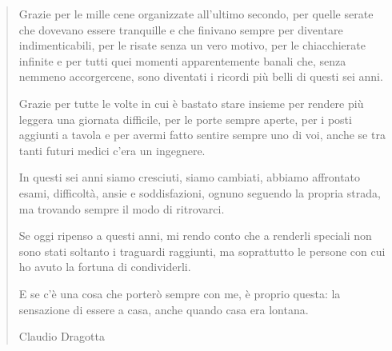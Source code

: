\begin{quote}
Grazie per le mille cene organizzate all'ultimo secondo, per quelle serate che dovevano essere tranquille e che finivano sempre per diventare indimenticabili, per le risate senza un vero motivo, per le chiacchierate infinite e per tutti quei momenti apparentemente banali che, senza nemmeno accorgercene, sono diventati i ricordi più belli di questi sei anni.\par

Grazie per tutte le volte in cui è bastato stare insieme per rendere più leggera una giornata difficile, per le porte sempre aperte, per i posti aggiunti a tavola e per avermi fatto sentire sempre uno di voi, anche se tra tanti futuri medici c'era un ingegnere.\par

In questi sei anni siamo cresciuti, siamo cambiati, abbiamo affrontato esami, difficoltà, ansie e soddisfazioni, ognuno seguendo la propria strada, ma trovando sempre il modo di ritrovarci.\par

Se oggi ripenso a questi anni, mi rendo conto che a renderli speciali non sono stati soltanto i traguardi raggiunti, ma soprattutto le persone con cui ho avuto la fortuna di condividerli.\par

E se c'è una cosa che porterò sempre con me, è proprio questa: la sensazione di essere a casa, anche quando casa era lontana.\par

\vfill
\begin{flushright}
    Claudio Dragotta
\end{flushright}

\end{quote}


\clearpage
